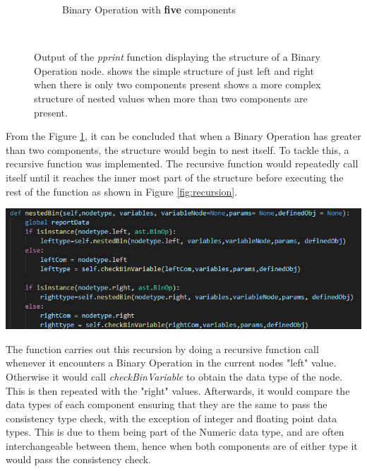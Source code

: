 \documentclass{l4proj}
\begin{document}
\begin{figure}[h]
\begin{subfigure}[b]{0.45\textwidth}
        \caption{Binary Operation with \textbf{five} components}
        \label{fig:Bin2}
    \end{subfigure}
    ~ %
    \caption{Output of the \textit{pprint} function displaying the structure of a Binary Operation node.  shows the simple structure of just left and right when there is only two components present 
    shows a more complex structure of nested values when more than two components are present.
    }\label{fig:BinOp}
\end{figure}

From the Figure \ref{fig:Bin2}, it can be concluded that when a Binary Operation has greater than two components, the structure would begin to nest itself. To tackle this, a recursive function was implemented. The recursive function would repeatedly call itself until it reaches the inner most part 
of the structure before executing the rest of the function as shown in Figure \ref{fig:recursion}.

\begin{center}
    \includegraphics[width=\textwidth]{images/BinRec.png}
    \label{fig:recursion}
\end{center}

The function carries out this recursion by doing a recursive function call whenever it encounters a Binary Operation in the current nodes "left" value. Otherwise it would call \textit{checkBinVariable} to obtain the data type of the node. This is then repeated with the "right" values. Afterwards, it would compare the data types of each component ensuring that they are the same to pass the consistency type check, with the exception of integer and floating point data types. This is due to them being part of the Numeric data type, and are often interchangeable between them, hence when both components are of either type it would pass the consistency check.
\end{document}
